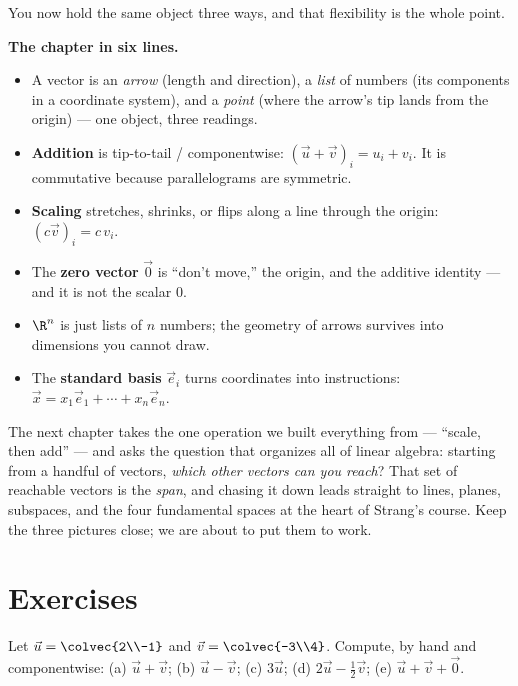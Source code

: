 You now hold the same object three ways, and that flexibility is the whole point.

\begin{focusbox}
\textbf{The chapter in six lines.}
\begin{itemize}
  \item A vector is an \emph{arrow} (length and direction), a \emph{list} of numbers
        (its components in a coordinate system), and a \emph{point} (where the arrow's tip
        lands from the origin) --- one object, three readings.
  \item \textbf{Addition} is tip-to-tail / componentwise: $(\vec{u}+\vec{v})_i = u_i+v_i$.
        It is commutative because parallelograms are symmetric.
  \item \textbf{Scaling} stretches, shrinks, or flips along a line through the origin:
        $(c\vec{v})_i = c\,v_i$.
  \item The \textbf{zero vector} $\vec{0}$ is ``don't move,'' the origin, and the additive
        identity --- and it is not the scalar $0$.
  \item $\R^n$ is just lists of $n$ numbers; the geometry of arrows survives into
        dimensions you cannot draw.
  \item The \textbf{standard basis} $\vec{e}_i$ turns coordinates into instructions:
        $\vec{x} = x_1\vec{e}_1 + \cdots + x_n\vec{e}_n$.
\end{itemize}
\end{focusbox}

The next chapter takes the one operation we built everything from --- ``scale, then
add'' --- and asks the question that organizes all of linear algebra: starting from a
handful of vectors, \emph{which other vectors can you reach}? That set of reachable
vectors is the \emph{span}, and chasing it down leads straight to lines, planes,
subspaces, and the four fundamental spaces at the heart of Strang's course. Keep the three
pictures close; we are about to put them to work.

\section{Exercises}
\label{ch02:exercises}

\begin{exercise}
\label{ch02:exr-arith}
Let $\vec{u}=\colvec{2\\-1}$ and $\vec{v}=\colvec{-3\\4}$. Compute, by hand and
componentwise:
(a) $\vec{u}+\vec{v}$; \quad
(b) $\vec{u}-\vec{v}$; \quad
(c) $3\vec{u}$; \quad
(d) $2\vec{u}-\tfrac12\vec{v}$; \quad
(e) $\vec{u}+\vec{v}+\vec{0}$.
\end{exercise}

